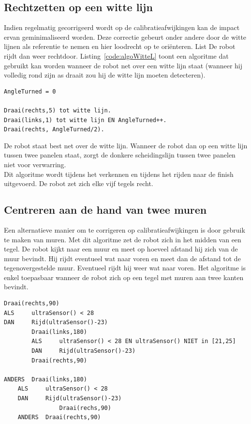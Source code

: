 \documentclass[eind]{penoverslag}
\begin{document}
\subsection{Rechtzetten op een witte lijn} %
\label{ssec:algoWitteL}
Indien regelmatig gecorrigeerd wordt op de calibratieafwijkingen kan de impact ervan geminimaliseerd worden. Deze correctie gebeurt onder andere door de witte lijnen als referentie te nemen en hier loodrecht op te ori\"enteren. List De robot rijdt dan weer rechtdoor. Listing~\ref{code:algoWitteL} toont een algoritme dat gebruikt kan worden wanneer de robot net over een witte lijn staat (wanneer hij volledig rond zijn as draait zou hij de witte lijn moeten detecteren).

\lstset{frame=single, caption=Witte Lijnalgoritme (pseudocode),
		label=code:algoWitteL, numbers=left, numberstyle=\footnotesize,
		basicstyle=\sffamily, numbersep=5pt}
\begin{lstlisting}
AngleTurned = 0

Draai(rechts,5) tot witte lijn.
Draai(links,1) tot witte lijn EN AngleTurned++.
Draai(rechts, AngleTurned/2).
\end{lstlisting}

De robot staat best net over de witte lijn. Wanneer de robot dan op een witte lijn tussen twee panelen staat, zorgt de donkere scheidingslijn tussen twee panelen niet voor verwarring.\\

Dit algoritme wordt tijdens het verkennen en tijdens het rijden naar de finish uitgevoerd. De robot zet zich elke vijf tegels recht.

\subsection{Centreren aan de hand van twee muren} %
\label{ssec:algoMuren}
Een alternatieve manier om te corrigeren op calibratieafwijkingen is door gebruik te maken van muren. Met dit algoritme zet de robot zich in het midden van een tegel. De robot kijkt naar een muur en meet op hoeveel afstand hij zich van de muur bevindt. Hij rijdt eventueel wat naar voren en meet dan de afstand tot de tegenovergestelde muur. Eventueel rijdt hij weer wat naar voren. Het algoritme is enkel toepasbaar wanneer de robot zich op een tegel met muren aan twee kanten bevindt.

\lstset{frame=single, caption=Muuralgoritme (pseudocode),
		label=code:algoWitteL, numbers=left, numberstyle=\footnotesize,
		basicstyle=\sffamily, numbersep=5pt}
\begin{lstlisting}
Draai(rechts,90)
ALS     ultraSensor() < 28
DAN 	Rijd(ultraSensor()-23)
    	Draai(links,180)
    	ALS 	ultraSensor() < 28 EN ultraSensor() NIET in [21,25]
        DAN 	Rijd(ultraSensor()-23)
		Draai(rechts,90)
		
ANDERS 	Draai(links,180)
	ALS 	ultraSensor() < 28
	DAN     Rijd(ultraSensor()-23)
       	        Draai(rechs,90)
	ANDERS	Draai(rechts,90)
\end{lstlisting}
\end{document}
